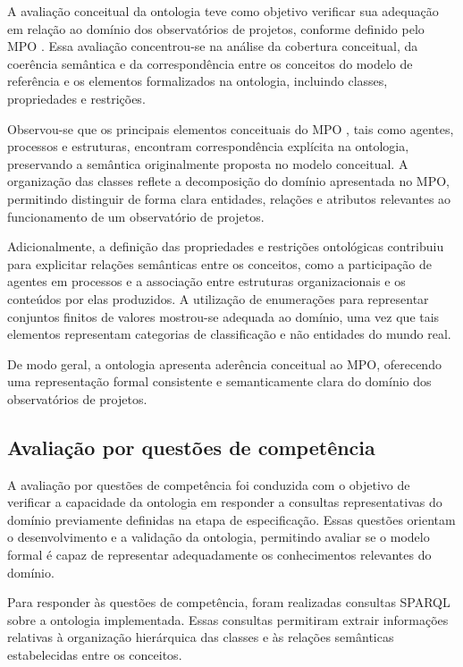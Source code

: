 A avaliação conceitual da ontologia teve como objetivo verificar sua adequação em relação ao domínio dos observatórios de projetos, conforme definido pelo MPO \cite{vieira2022thesis}. Essa avaliação concentrou-se na análise da cobertura conceitual, da coerência semântica e da correspondência entre os conceitos do modelo de referência e os elementos formalizados na ontologia, incluindo classes, propriedades e restrições.

Observou-se que os principais elementos conceituais do MPO \cite{vieira2022thesis}, tais como agentes, processos e estruturas, encontram correspondência explícita na ontologia, preservando a semântica originalmente proposta no modelo conceitual. A organização das classes reflete a decomposição do domínio apresentada no MPO, permitindo distinguir de forma clara entidades, relações e atributos relevantes ao funcionamento de um observatório de projetos.

Adicionalmente, a definição das propriedades e restrições ontológicas contribuiu para explicitar relações semânticas entre os conceitos, como a participação de agentes em processos e a associação entre estruturas organizacionais e os conteúdos por elas produzidos. A utilização de enumerações para representar conjuntos finitos de valores mostrou-se adequada ao domínio, uma vez que tais elementos representam categorias de classificação e não entidades do mundo real.

De modo geral, a ontologia apresenta aderência conceitual ao MPO, oferecendo uma representação formal consistente e semanticamente clara do domínio dos observatórios de projetos.

\subsection{Avaliação por questões de competência}

A avaliação por questões de competência foi conduzida com o objetivo de verificar a capacidade da ontologia em responder a consultas representativas do domínio previamente definidas na etapa de especificação. Essas questões orientam o desenvolvimento e a validação da ontologia, permitindo avaliar se o modelo formal é capaz de representar adequadamente os conhecimentos relevantes do domínio.

Para responder às questões de competência, foram realizadas consultas SPARQL sobre a ontologia implementada. Essas consultas permitiram extrair informações relativas à organização hierárquica das classes e às relações semânticas estabelecidas entre os conceitos.

